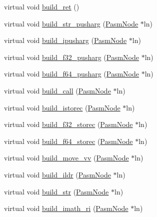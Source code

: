 \begin{DoxyCompactItemize}
virtual void \hyperlink{classCompilerBase_ac202164bbf4d7dfd7a9e2de67c476e17}{build\+\_\+ret} ()
\item 
virtual void \hyperlink{classCompilerBase_a1efd217d6d22c9919f5b99018ea3cf9f}{build\+\_\+str\+\_\+pusharg} (\hyperlink{classPASM_1_1PasmNode}{Pasm\+Node} $\ast$ln)
\item 
virtual void \hyperlink{classCompilerBase_a288b6e90d5df00ce0238150795f401ec}{build\+\_\+ipusharg} (\hyperlink{classPASM_1_1PasmNode}{Pasm\+Node} $\ast$ln)
\item 
virtual void \hyperlink{classCompilerBase_ae6a4f495682ecf0a8761b87d71246f4b}{build\+\_\+f32\+\_\+pusharg} (\hyperlink{classPASM_1_1PasmNode}{Pasm\+Node} $\ast$ln)
\item 
virtual void \hyperlink{classCompilerBase_adb6cead8b6cdd9abbd3e8c180e38b26d}{build\+\_\+f64\+\_\+pusharg} (\hyperlink{classPASM_1_1PasmNode}{Pasm\+Node} $\ast$ln)
\item 
virtual void \hyperlink{classCompilerBase_a275108caeb856f4a38e9d1e8ea7dd40f}{build\+\_\+call} (\hyperlink{classPASM_1_1PasmNode}{Pasm\+Node} $\ast$ln)
\item 
virtual void \hyperlink{classCompilerBase_ab7f9e8221e581c2cc26037c053eff5ee}{build\+\_\+istorec} (\hyperlink{classPASM_1_1PasmNode}{Pasm\+Node} $\ast$ln)
\item 
virtual void \hyperlink{classCompilerBase_ab01c7f8c014a79f5ce7a9bdf49e3cf11}{build\+\_\+f32\+\_\+storec} (\hyperlink{classPASM_1_1PasmNode}{Pasm\+Node} $\ast$ln)
\item 
virtual void \hyperlink{classCompilerBase_a2b8edb7ea1e24aa0704183e46658a053}{build\+\_\+f64\+\_\+storec} (\hyperlink{classPASM_1_1PasmNode}{Pasm\+Node} $\ast$ln)
\item 
virtual void \hyperlink{classCompilerBase_aaf76df6d9e05d6781e44bdab767e9a2e}{build\+\_\+move\+\_\+vv} (\hyperlink{classPASM_1_1PasmNode}{Pasm\+Node} $\ast$ln)
\item 
virtual void \hyperlink{classCompilerBase_a6c2b27c60d51e2ddb38f575280cd12e2}{build\+\_\+ildr} (\hyperlink{classPASM_1_1PasmNode}{Pasm\+Node} $\ast$ln)
\item 
virtual void \hyperlink{classCompilerBase_ae6a6d6b3617855835d44734698ac6201}{build\+\_\+str} (\hyperlink{classPASM_1_1PasmNode}{Pasm\+Node} $\ast$ln)
\item 
virtual void \hyperlink{classCompilerBase_aba05b29977578c55ce1f22995a2d44b9}{build\+\_\+imath\+\_\+ri} (\hyperlink{classPASM_1_1PasmNode}{Pasm\+Node} $\ast$ln)
\item 

\end{DoxyCompactItemize}
